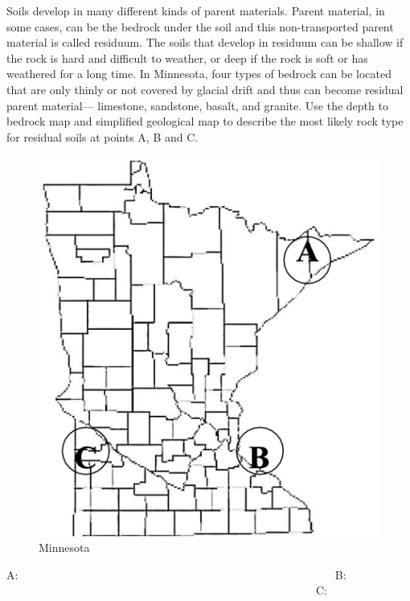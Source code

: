 \documentclass[
  letterpaper,
  twocolumn,
  portrait]{scrbook}
\begin{document}
Soils develop in many different kinds of parent materials. Parent
material, in some cases, can be the bedrock under the soil and this
non-transported parent material is called residuum. The soils that
develop in residuum can be shallow if the rock is hard and difficult to
weather, or deep if the rock is soft or has weathered for a long time.
In Minnesota, four types of bedrock can be located that are only thinly
or not covered by glacial drift and thus can become residual parent
material--- limestone, sandstone, basalt, and granite. Use the depth to
bedrock map and simplified geological map to describe the most likely
rock type for residual soils at points A, B and C.

\begin{figure}

{\centering \includegraphics{residual-parent-materials-Picture1.png}

}

\caption{\label{fig-residual}Minnesota}

\end{figure}

A: ~~~~~~~~~~~~~~~~~~~~~~~~~~~~~~~~~~~~~~~ ~~~~~~~~~~~~~~~~B:
~~~~~~~~~~~~~~~~~~~~~~~~~~~~~~~~~~~~~~~~~~~~~~~~~~~~~~~C:
\end{document}
